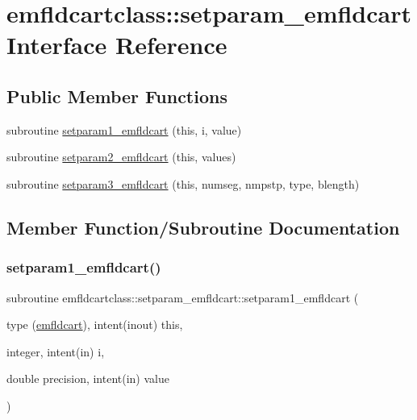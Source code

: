 \hypertarget{interfaceemfldcartclass_1_1setparam__emfldcart}{}\section{emfldcartclass\+::setparam\+\_\+emfldcart Interface Reference}
\label{interfaceemfldcartclass_1_1setparam__emfldcart}
\subsection*{Public Member Functions}
\begin{DoxyCompactItemize}
\item 
subroutine \mbox{\hyperlink{interfaceemfldcartclass_1_1setparam__emfldcart_aa5171ad991011ebd3ed36eab5d77f9ba}{setparam1\+\_\+emfldcart}} (this, i, value)
\item 
subroutine \mbox{\hyperlink{interfaceemfldcartclass_1_1setparam__emfldcart_aa53d2bf171490337016462da90d65d65}{setparam2\+\_\+emfldcart}} (this, values)
\item 
subroutine \mbox{\hyperlink{interfaceemfldcartclass_1_1setparam__emfldcart_afe0ff5cd84f8cbfd15f0510209fb985b}{setparam3\+\_\+emfldcart}} (this, numseg, nmpstp, type, blength)
\end{DoxyCompactItemize}


\subsection{Member Function/\+Subroutine Documentation}
\mbox{\label{interfaceemfldcartclass_1_1setparam__emfldcart_aa5171ad991011ebd3ed36eab5d77f9ba}} 
\subsubsection{\texorpdfstring{setparam1\_emfldcart()}{setparam1\_emfldcart()}}
{\footnotesize\ttfamily subroutine emfldcartclass\+::setparam\+\_\+emfldcart\+::setparam1\+\_\+emfldcart (\begin{DoxyParamCaption}\item[{type (\mbox{\hyperlink{namespaceemfldcartclass_structemfldcartclass_1_1emfldcart}{emfldcart}}), intent(inout)}]{this,  }\item[{integer, intent(in)}]{i,  }\item[{double precision, intent(in)}]{value }\end{DoxyParamCaption})}

